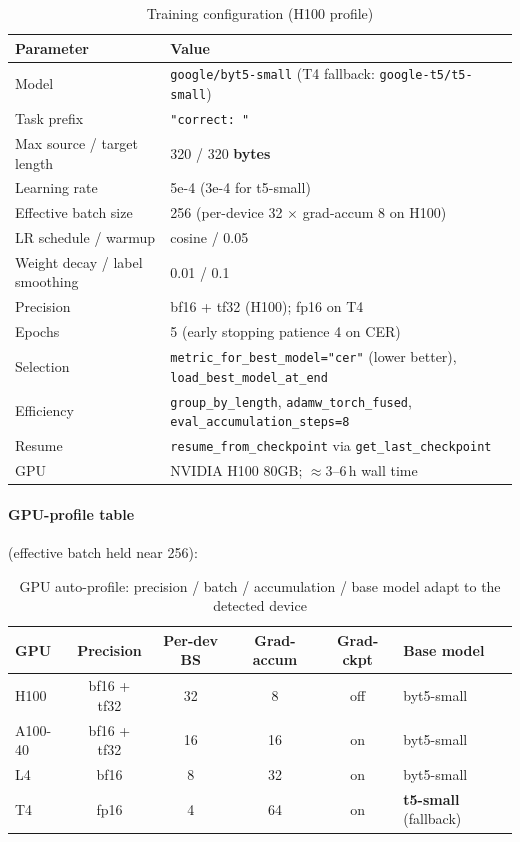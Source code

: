 \documentclass[12pt,a4paper]{article}
\begin{document}
\begin{table}[H]
\centering
\caption{Training configuration (H100 profile)}
\begin{tabular}{ll}
\toprule
\textbf{Parameter} & \textbf{Value} \\
\midrule
Model & \texttt{google/byt5-small} (T4 fallback: \texttt{google-t5/t5-small}) \\
Task prefix & \texttt{"correct: "} \\
Max source / target length & 320 / 320 \textbf{bytes} \\
Learning rate & 5e-4 (3e-4 for t5-small) \\
Effective batch size & 256 (per-device 32 $\times$ grad-accum 8 on H100) \\
LR schedule / warmup & cosine / 0.05 \\
Weight decay / label smoothing & 0.01 / 0.1 \\
Precision & bf16 + tf32 (H100); fp16 on T4 \\
Epochs & 5 (early stopping patience 4 on CER) \\
Selection & \texttt{metric\_for\_best\_model="cer"} (lower better), \texttt{load\_best\_model\_at\_end} \\
Efficiency & \texttt{group\_by\_length}, \texttt{adamw\_torch\_fused}, \texttt{eval\_accumulation\_steps=8} \\
Resume & \texttt{resume\_from\_checkpoint} via \texttt{get\_last\_checkpoint} \\
GPU & NVIDIA H100 80GB; $\approx$3--6\,h wall time \\
\bottomrule
\end{tabular}
\end{table}

\paragraph{GPU-profile table} (effective batch held near 256):

\begin{table}[H]
\centering
\caption{GPU auto-profile: precision / batch / accumulation / base model adapt to the detected device}
\begin{tabular}{lccccl}
\toprule
\textbf{GPU} & \textbf{Precision} & \textbf{Per-dev BS} & \textbf{Grad-accum} & \textbf{Grad-ckpt} & \textbf{Base model} \\
\midrule
H100      & bf16 + tf32 & 32 & 8  & off & byt5-small \\
A100-40   & bf16 + tf32 & 16 & 16 & on  & byt5-small \\
L4        & bf16        & 8  & 32 & on  & byt5-small \\
T4        & fp16        & 4  & 64 & on  & \textbf{t5-small} (fallback) \\
\bottomrule
\end{tabular}
\end{table}
\end{document}
